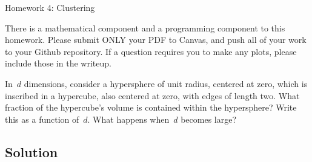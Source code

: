 \documentclass[submit]{harvardml}
\begin{document}
\begin{center}
{\Large Homework 4: Clustering}\\
\end{center}

There is a mathematical component and a programming component to this homework.
Please submit ONLY your PDF to Canvas, and push all of your work to your Github
repository. If a question requires you to make any plots, please
include those in the writeup.


\begin{problem}
In~$d$ dimensions, consider a hypersphere of unit radius, centered at zero,
which is inscribed in a hypercube, also centered at zero, with edges of length
two.  What fraction of the hypercube's volume is contained within the
hypersphere?  Write this as a function of~$d$.  What happens when~$d$ becomes
large?
\end{problem}

\subsection*{Solution}
\end{document}
